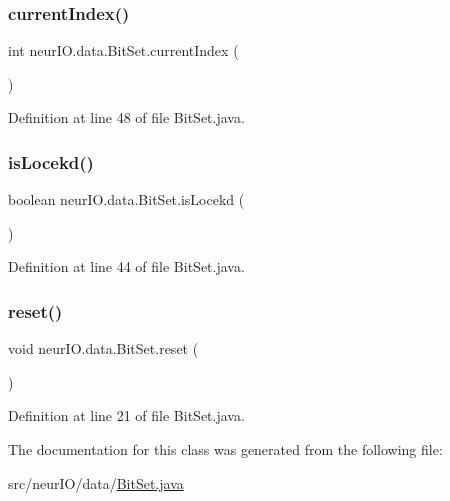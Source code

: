 \subsubsection{\texorpdfstring{current\+Index()}{currentIndex()}}
{\footnotesize\ttfamily int neur\+I\+O.\+data.\+Bit\+Set.\+current\+Index (\begin{DoxyParamCaption}{ }\end{DoxyParamCaption})}



Definition at line 48 of file Bit\+Set.\+java.

\mbox{\label{classneur_i_o_1_1data_1_1_bit_set_a4d57df84bc520d32429e6ae8ee4b2d9f}} 
\subsubsection{\texorpdfstring{is\+Locekd()}{isLocekd()}}
{\footnotesize\ttfamily boolean neur\+I\+O.\+data.\+Bit\+Set.\+is\+Locekd (\begin{DoxyParamCaption}{ }\end{DoxyParamCaption})}



Definition at line 44 of file Bit\+Set.\+java.

\mbox{\label{classneur_i_o_1_1data_1_1_bit_set_af6f1dfe4ce5582a89dd327305d6d8f87}} 
\subsubsection{\texorpdfstring{reset()}{reset()}}
{\footnotesize\ttfamily void neur\+I\+O.\+data.\+Bit\+Set.\+reset (\begin{DoxyParamCaption}{ }\end{DoxyParamCaption})}



Definition at line 21 of file Bit\+Set.\+java.



The documentation for this class was generated from the following file\+:\begin{DoxyCompactItemize}
\item 
src/neur\+I\+O/data/\hyperlink{_bit_set_8java}{Bit\+Set.\+java}\end{DoxyCompactItemize}
